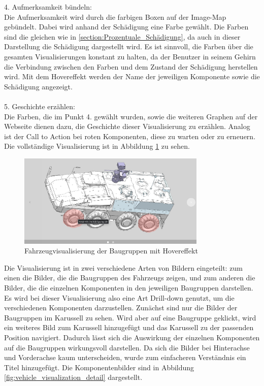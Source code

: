 4. Aufmerksamkeit bündeln:\\
Die Aufmerksamkeit wird durch die farbigen Boxen auf der Image-Map gebündelt. Dabei wird anhand der Schädigung eine Farbe gewählt. Die Farben sind die gleichen wie in \ref{section:Prozentuale_Schädigung}, da auch in dieser Darstellung die Schädigung dargestellt wird. Es ist sinnvoll, die Farben über die gesamten Visualisierungen konstant zu halten, da der Benutzer in seinem Gehirn die Verbindung zwischen den Farben und dem Zustand der Schädigung herstellen wird. Mit dem Hovereffekt werden der Name der jeweiligen Komponente sowie die Schädigung angezeigt.\\\\
5. Geschichte erzählen:\\
Die Farben, die im Punkt 4. gewählt wurden, sowie die weiteren Graphen auf der Webseite dienen dazu, die Geschichte dieser Visualisierung zu erzählen. Analog ist der Call to Action bei \glqq roten\grqq{} Komponenten, diese zu warten oder zu erneuern. Die vollständige Visualisierung ist in Abbildung \ref{fig:vehicle_visualization_after} zu sehen. 
\begin{figure}[h!]
\centering
\includegraphics[width=0.8\textwidth]{gfx/vehicle_visualisation_after.png}
\caption{Fahrzeugvisualisierung der Baugruppen mit Hovereffekt}
\label{fig:vehicle_visualization_after}
\end{figure}
\noindent
Die Visualisierung ist in zwei verschiedene Arten von Bildern eingeteilt: zum einen die Bilder, die die Baugruppen des Fahrzeugs zeigen, und zum anderen die Bilder, die die einzelnen Komponenten in den jeweiligen Baugruppen darstellen. Es wird bei dieser Visualisierung also eine Art Drill-down genutzt, um die verschiedenen Komponenten darzustellen. Zunächst sind nur die Bilder der Baugruppen im Karussell zu sehen. Wird aber auf eine Baugruppe geklickt, wird ein weiteres Bild zum Karussell hinzugefügt und das Karussell zu der passenden Position navigiert. Dadurch lässt sich die Auswirkung der einzelnen Komponenten auf die Baugruppen wirkungsvoll darstellen. Da sich die Bilder bei Hinterachse und Vorderachse kaum unterscheiden, wurde zum einfacheren Verständnis ein Titel hinzugefügt. Die Komponentenbilder sind in Abbildung \ref{fig:vehicle_visualization_detail} dargestellt.
